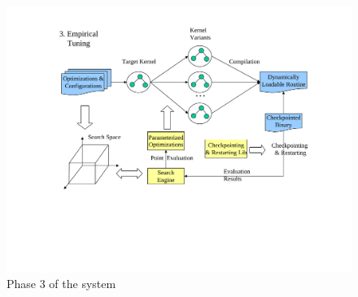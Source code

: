 \begin{figure}[htbp]  
	\centering
		\includegraphics[width=1.2\textwidth]{phase3.pdf}
	\caption{Phase 3 of the system}
	\label{fig:phase3}
\end{figure}

